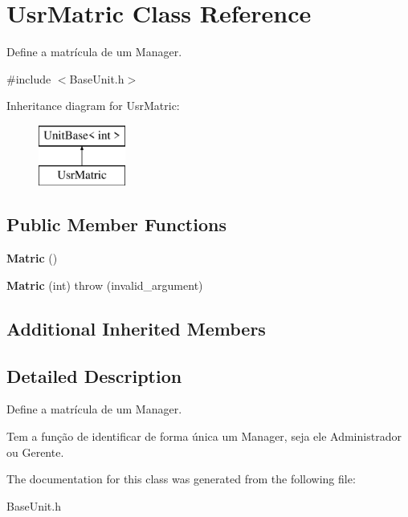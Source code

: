 \hypertarget{classUsrMatric}{\section{Usr\-Matric Class Reference}
\label{classUsrMatric}
}


Define a matrícula de um Manager.  




{\ttfamily \#include $<$Base\-Unit.\-h$>$}

Inheritance diagram for Usr\-Matric\-:\begin{figure}[H]
\begin{center}
\leavevmode
\includegraphics[height=2.000000cm]{classUsrMatric}
\end{center}
\end{figure}
\subsection*{Public Member Functions}
\begin{DoxyCompactItemize}
\item 
\hypertarget{classUsrMatric_a62732ab82c25990f4e37ad7575760630}{{\bfseries Matric} ()}\label{classUsrMatric_a62732ab82c25990f4e37ad7575760630}

\item 
\hypertarget{classUsrMatric_a986f012bd822779ed3a256dddfd26581}{{\bfseries Matric} (int)  throw (invalid\-\_\-argument)}\label{classUsrMatric_a986f012bd822779ed3a256dddfd26581}

\end{DoxyCompactItemize}
\subsection*{Additional Inherited Members}


\subsection{Detailed Description}
Define a matrícula de um Manager. 

Tem a função de identificar de forma única um Manager, seja ele Administrador ou Gerente. 

The documentation for this class was generated from the following file\-:\begin{DoxyCompactItemize}
\item 
Base\-Unit.\-h\end{DoxyCompactItemize}
